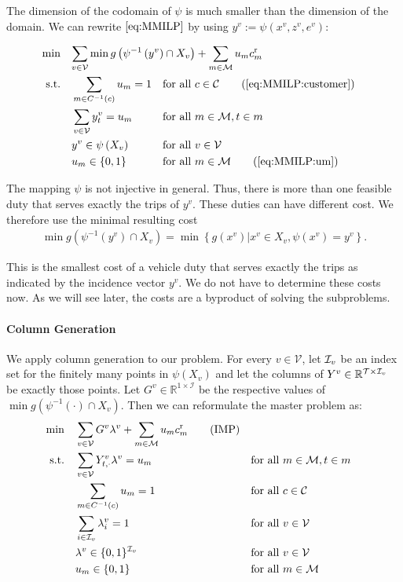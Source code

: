 The dimension of the codomain of $\psi$ is much smaller than the dimension of the domain. We can rewrite $\eqref{eq:MMILP}$ by using $y^v:=\psi\left(x^v,z^v,e^v\right)$:

\begin{align}
	\min \quad & \omit\rlap{$\displaystyle{\sum_{v\in\mathcal{V}}\min g\left(\psi^{-1}\left(y^v\right)\cap X_v\right) + \sum_{m\in\mathcal{M}}u_m\croute_m}$} \nonumber \\
	\text{s.t.} \quad & \sum_{m\in C^{-1}(c)} u_m = 1 && \text{for all } c\in\mathcal{C} \tag{\ref{eq:MMILP:customer}} \\
	& \sum_{v\in\mathcal{V}}y^v_t = u_m && \text{for all } m\in\mathcal{M},t\in m \label{eq:MMILP:linking_y} \\
	& y^v\in \psi\left(X_v\right) && \text{for all } v\in\mathcal{V} \nonumber \\
	& u_m\in\{0,1\} && \text{for all } m\in\mathcal{M} \tag{\ref{eq:MMILP:um}}
\end{align}

The mapping $\psi$ is not injective in general. Thus, there is more than one feasible duty that serves exactly the trips of $y^v$. These duties can have different cost. We therefore use the minimal resulting cost
\begin{align*}
	\min g\left(\psi^{-1}\left(y^v\right)\cap X_v\right) = \min \left\{g\left(x^v\right)|x^v\in X_v, \psi\left(x^v\right)=y^v\right\}.
\end{align*}

This is the smallest cost of a vehicle duty that serves exactly the trips as indicated by the incidence vector $y^v$. We do not have to determine these costs now. As we will see later, the costs are a byproduct of solving the subproblems.

\paragraph{Column Generation} \parfill

We apply column generation to our problem. For every $v\in\mathcal{V}$, let $\mathcal{I}_v$ be an index set for the finitely many points in $\psi\left(X_v\right)$ and let the columns of $Y^v\in\mathbb{R}^{\mathcal{T}\times\mathcal{I}_v}$ be exactly those points. Let $G^v\in\mathbb{R}^{1\times\mathcal{I}}$ be the respective values of $\min g\left(\psi^{-1}(\cdot)\cap X_v\right)$. Then we can reformulate the master problem as:
\begin{align*}
	\min \quad & \sum_{v\in\mathcal{V}}G^v\lambda^v + \sum_{m\in\mathcal{M}}u_mc^{\operatorname{r}}_m \tag{IMP} \label{eq:IMP} \\
	\text{s.t.} \quad & \sum_{v\in\mathcal{V}} Y^v_{t,\cdot}\lambda^v = u_m && \text{for all } m\in\mathcal{M},t\in m \\
	& \sum_{m\in C^{-1}(c)} u_m = 1 && \text{for all } c\in\mathcal{C} \\
	& \sum_{i\in\mathcal{I}_v}\lambda_i^v=1 && \text{for all } v\in\mathcal{V}\\
	& \lambda^v\in\{0,1\}^{\mathcal{I}_v} && \text{for all } v\in\mathcal{V} \\
	& u_m\in\{0,1\} && \text{for all } m\in\mathcal{M}
\end{align*}

